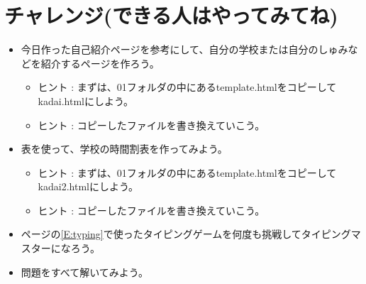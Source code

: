 \documentclass[a4paper,12pt]{jarticle}
\begin{document}
\section{チャレンジ(できる人はやってみてね)}
\begin{itemize}
      \item
            今日作った自己紹介ページを参考にして、自分の学校または自分のしゅみなどを紹介するページを作ろう。

            \begin{itemize}
                  \item ヒント :
                        まずは、01フォルダの中にあるtemplate.htmlをコピーしてkadai.htmlにしよう。
                  \item ヒント :
                        コピーしたファイルを書き換えていこう。
            \end{itemize}
      \item
            表を使って、学校の時間割表を作ってみよう。

            \begin{itemize}
                  \item ヒント :
                        まずは、01フォルダの中にあるtemplate.htmlをコピーしてkadai2.htmlにしよう。
                  \item ヒント :
                        コピーしたファイルを書き換えていこう。
            \end{itemize}
      \item
            \pageref*{E:typing}ページの\ref*{E:typing}で使ったタイピングゲームを何度も挑戦してタイピングマスターになろう。
      \item 問題をすべて解いてみよう。
\end{itemize}

\bigskip


\bigskip


\bigskip

\clearpage
\end{document}
